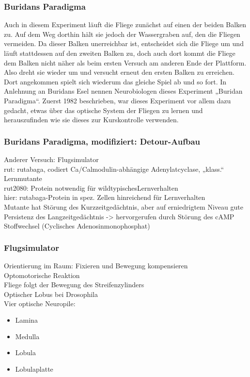\subsubsection{Buridans Paradigma}
Auch in diesem Experiment läuft die Fliege zunächst auf einen der beiden Balken zu. Auf dem Weg dorthin hält sie jedoch der Wassergraben auf, den die Fliegen vermeiden. Da dieser Balken unerreichbar ist, entscheidet sich die Fliege um und läuft stattdessen auf den zweiten Balken zu, doch auch dort kommt die Fliege dem Balken nicht näher als beim ersten Versuch am anderen Ende der Plattform. Also dreht sie wieder um und versucht erneut den ersten Balken zu erreichen. Dort angekommen spielt sich wiederum das gleiche Spiel ab und so fort. In Anlehnung an Buridans Esel nennen Neurobiologen dieses Experiment „Buridan Paradigma“. Zuerst 1982 beschrieben, war dieses Experiment vor allem dazu gedacht, etwas über das optische System der Fliegen zu lernen und herauszufinden wie sie dieses zur Kurskontrolle verwenden.

\subsubsection{Buridans Paradigma, modifiziert: Detour-Aufbau}
Anderer Versuch: Flugsimulator\\
rut: rutabaga, codiert Ca/Calmodulin-abhängige Adenylatcyclase, „klass.“ Lernmutante\\
rut2080: Protein notwendig für wildtypischesLernverhalten\\
hier: rutabaga-Protein in spez. Zellen hinreichend für Lernverhalten\\
Mutante hat Störung des Kurzzeitgedächtnis, aber auf erniedrigtem Niveau gute Persistenz des Langzeitgedächtnis -> hervorgerufen durch Störung des cAMP Stoffwechsel (Cyclisches Adenosinmonophosphat)

\subsubsection{Flugsimulator}
Orientierung im Raum: Fixieren und Bewegung kompensieren\\
Optomotorische Reaktion\\
Fliege folgt der Bewegung des Streifenzylinders\\
Optischer Lobus bei Drosophila\\
Vier optische Neuropile:
\begin{itemize}
	\item Lamina
	\item Medulla
	\item Lobula
	\item Lobulaplatte
\end{itemize}
